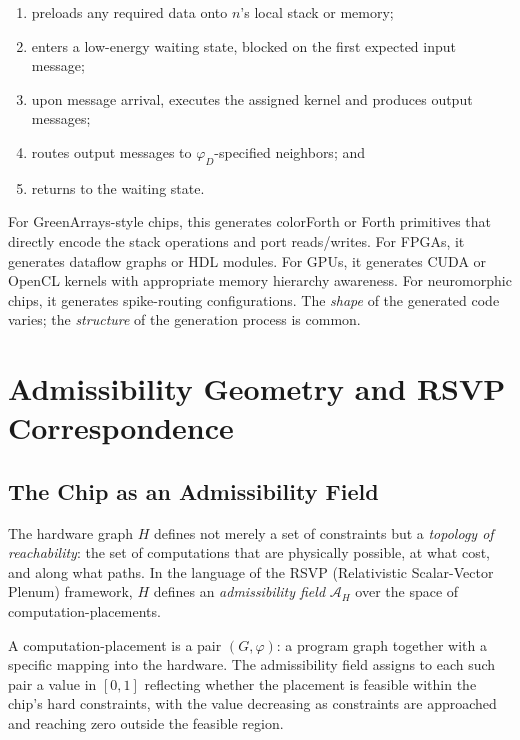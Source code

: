 \documentclass[11pt, a4paper]{article}
\begin{document}
\begin{enumerate}
  \item preloads any required data onto $n$'s local stack or memory;
  \item enters a low-energy waiting state, blocked on the first expected input message;
  \item upon message arrival, executes the assigned kernel and produces output messages;
  \item routes output messages to $\varphi_D$-specified neighbors; and
  \item returns to the waiting state.
\end{enumerate}

For GreenArrays-style chips, this generates colorForth or Forth primitives that directly
encode the stack operations and port reads/writes. For FPGAs, it generates dataflow graphs
or HDL modules. For GPUs, it generates CUDA or OpenCL kernels with appropriate memory
hierarchy awareness. For neuromorphic chips, it generates spike-routing configurations.
The \emph{shape} of the generated code varies; the \emph{structure} of the generation
process is common.

\section{Admissibility Geometry and RSVP Correspondence}

\subsection{The Chip as an Admissibility Field}

The hardware graph $H$ defines not merely a set of constraints but a \emph{topology of
reachability}: the set of computations that are physically possible, at what cost, and
along what paths. In the language of the RSVP (Relativistic Scalar-Vector Plenum)
framework, $H$ defines an \emph{admissibility field} $\mathcal{A}_H$ over the space
of computation-placements.

A computation-placement is a pair $(G, \varphi)$: a program graph together with a
specific mapping into the hardware. The admissibility field assigns to each such pair
a value in $[0, 1]$ reflecting whether the placement is feasible within the chip's
hard constraints, with the value decreasing as constraints are approached and reaching
zero outside the feasible region.
\end{document}
